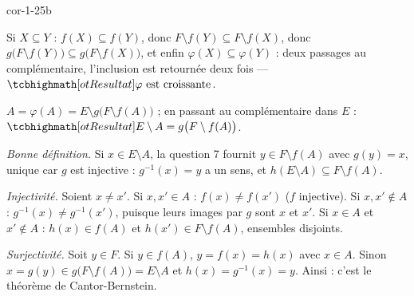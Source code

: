 \begin{blocLivre}{cor-1-25b}
\begin{corrigeSuite}
\begin{questions}[start=6]
  \item Si $X\subseteq Y$ : $f(X)\subseteq f(Y)$, donc
    $F\setminus f(Y)\subseteq F\setminus f(X)$, donc
    $g\bigl(F\setminus f(Y)\bigr)\subseteq g\bigl(F\setminus f(X)\bigr)$,
    et enfin $\varphi(X)\subseteq\varphi(Y)$ : deux passages au
    complémentaire, l'inclusion est retournée deux fois —
    $\res{\varphi\text{ est croissante}}$.
  \item $A=\varphi(A)=E\setminus g\bigl(F\setminus f(A)\bigr)$ ; en
    passant au complémentaire dans $E$ :
    $\res{E\setminus A=g\bigl(F\setminus f(A)\bigr)}$.
  \item \emph{Bonne définition.} Si $x\in E\setminus A$, la question 7
    fournit $y\in F\setminus f(A)$ avec $g(y)=x$, unique car $g$ est
    injective : $g^{-1}(x)=y$ a un sens, et
    $h(E\setminus A)\subseteq F\setminus f(A)$.

    \emph{Injectivité.} Soient $x\neq x'$. Si $x,x'\in A$ :
    $f(x)\neq f(x')$ ($f$ injective). Si $x,x'\notin A$ :
    $g^{-1}(x)\neq g^{-1}(x')$, puisque leurs images par $g$ sont $x$ et
    $x'$. Si $x\in A$ et $x'\notin A$ : $h(x)\in f(A)$ et
    $h(x')\in F\setminus f(A)$, ensembles disjoints.

    \emph{Surjectivité.} Soit $y\in F$. Si $y\in f(A)$, $y=f(x)=h(x)$
    avec $x\in A$. Sinon $x=g(y)\in g\bigl(F\setminus f(A)\bigr)
    =E\setminus A$ et $h(x)=g^{-1}(x)=y$. Ainsi
     : c'est le
    théorème de Cantor-Bernstein.
\end{questions}
\end{corrigeSuite}
\end{blocLivre}

